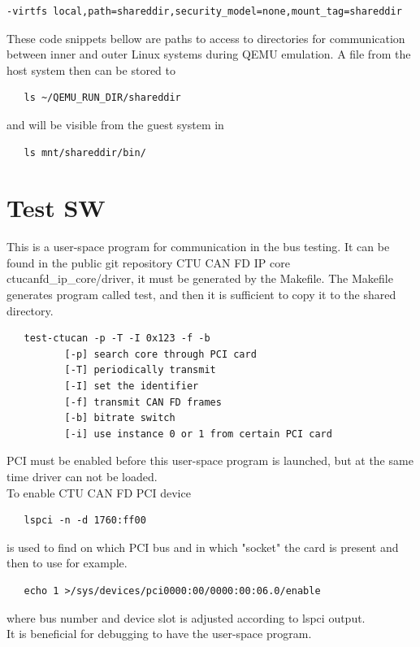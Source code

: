 \documentclass{ctuthesis}
\begin{document}
 \begin{verbatim}-virtfs local,path=shareddir,security_model=none,mount_tag=shareddir\end{verbatim}
 These code snippets bellow are paths to access to directories for communication between inner and outer Linux systems during QEMU emulation. A file from the host system then can be stored to
  \begin{verbatim}   ls ~/QEMU_RUN_DIR/shareddir\end{verbatim}
  and will be visible from the guest system in
 \begin{verbatim}   ls mnt/shareddir/bin/\end{verbatim}
 \section{Test SW}
 This is a user-space program for communication in the bus testing. It can be found in the public git repository CTU CAN FD IP core  \cite{driver-repo} ctucanfd\_ip\_core/driver, it must be generated by the Makefile. The Makefile generates program called test, and then it is sufficient to copy it to the shared directory.
 \begin{verbatim}   test-ctucan -p -T -I 0x123 -f -b
          [-p] search core through PCI card
          [-T] periodically transmit
          [-I] set the identifier
          [-f] transmit CAN FD frames
          [-b] bitrate switch
          [-i] use instance 0 or 1 from certain PCI card\end{verbatim}
 PCI must be enabled before this user-space program is launched, but at the same time driver can not be loaded. \\
 To enable CTU CAN FD PCI device
\begin{verbatim}   lspci -n -d 1760:ff00\end{verbatim}
is used to find on which PCI bus and in which "socket" the card is present and then to use for example.
\begin{verbatim}   echo 1 >/sys/devices/pci0000:00/0000:00:06.0/enable\end{verbatim}
where bus number and device slot is adjusted according to lspci output.\\
 It is beneficial for debugging to have the user-space program.
 
\end{document}
